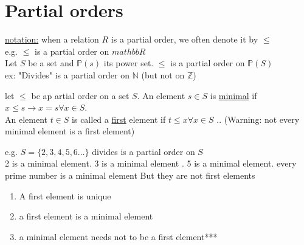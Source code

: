 \documentclass{article}
\begin{document}
\section{Partial orders }
\underline{notation:} when a relation $R$ is a partial order, we often denote it by $\leq$ \\
e.g. $\leq$ is a partial order on $mathbbR$ \\
Let $S$ be a set and $\mathbb{P}(s)$ its power set. $\leq$ is a partial order on $\mathbb{P}(S)$ \\ 
ex: "Divides" is a partial order on $\mathbb{N}$ (but not on $\mathbb{Z}$)
\begin{definition}
    let $\leq$ be ap artial order on a set $S$. An element $s \in S$ is \underline{minimal} if $ x\leq s \rightarrow x = s \forall x \in S$. \\ 
    An element $t \in S$ is called a \underline{first} element if $ t \leq x \forall x \in S$ .. (Warning: not every minimal element is a first element)
\end{definition}
    e.g. $S = \{ 2, 3, 4, 5, 6 \dots \}$ divides is a partial order on $S$ 
    \\ 2 is a minimal element. 3 is a minimal element . 5 is a minimal element. every prime number is a minimal element  
    But they are not  first elements 
    \begin{proposition}
        \begin{enumerate}
            \item A first element is unique 
            \item a first element is a minimal element 
            \item a minimal element needs not to be a first element*** 
        \end{enumerate}
    \end{proposition}
\end{document}
